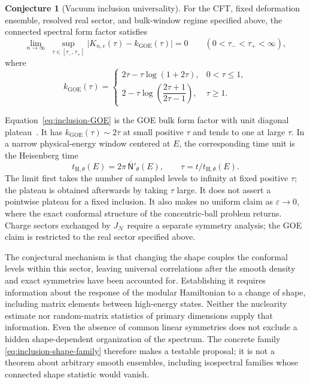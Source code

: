 \documentclass[a4paper,11pt]{article}
\theoremstyle{definition}
\newtheorem{prop}{Conjecture}
\begin{document}
\begin{prop}[Vacuum inclusion universality]\label{conj:modular-SFF}
For the CFT, fixed deformation ensemble, resolved real sector, and bulk-window regime specified above, the connected spectral form factor satisfies
\begin{equation}
 \lim_{n\to\infty}\;
 \sup_{\tau\in[\tau_-,\tau_+]}
 \bigl|K_{n,\mathrm c}(\tau)-k_{\mathrm{GOE}}(\tau)\bigr|=0
 \qquad (0<\tau_-<\tau_+<\infty),
 \label{eq:inclusion-universality}
\end{equation}
where
\begin{equation}
 k_{\mathrm{GOE}}(\tau)=
 \begin{cases}
  2\tau-\tau\log(1+2\tau),&0<\tau\le1,\\[2pt]
  2-\tau\log\!\left(\dfrac{2\tau+1}{2\tau-1}\right),&\tau\ge1.
 \end{cases}
 \label{eq:inclusion-GOE}
\end{equation}
\end{prop}

Equation~\eqref{eq:inclusion-GOE} is the GOE bulk form factor with unit diagonal plateau~\cite{CipolloniErdosSchroder2023}. It has $k_{\mathrm{GOE}}(\tau)\sim2\tau$ at small positive $\tau$ and tends to one at large $\tau$. In a narrow physical-energy window centered at $E$, the corresponding time unit is the Heisenberg time
\begin{equation}
 t_{\mathrm H,\theta}(E)=2\pi\,\overline{\mathsf N}'_\theta(E),
 \qquad \tau=t/t_{\mathrm H,\theta}(E).
 \label{eq:inclusion-Heisenberg}
\end{equation}
The limit first takes the number of sampled levels to infinity at fixed positive $\tau$; the plateau is obtained afterwards by taking $\tau$ large. It does not assert a pointwise plateau for a fixed inclusion. It also makes no uniform claim as $\varepsilon\to0$, where the exact conformal structure of the concentric-ball problem returns. Charge sectors exchanged by $J_{\mathcal N}$ require a separate symmetry analysis; the GOE claim is restricted to the real sector specified above.

The conjectural mechanism is that changing the shape couples the conformal levels within this sector, leaving universal correlations after the smooth density and exact symmetries have been accounted for. Establishing it requires information about the response of the modular Hamiltonian to a change of shape, including matrix elements between high-energy states. Neither the nuclearity estimate nor random-matrix statistics of primary dimensions supply that information. Even the absence of common linear symmetries does not exclude a hidden shape-dependent organization of the spectrum. The concrete family \eqref{eq:inclusion-shape-family} therefore makes a testable proposal; it is not a theorem about arbitrary smooth ensembles, including isospectral families whose connected shape statistic would vanish.
\end{document}
